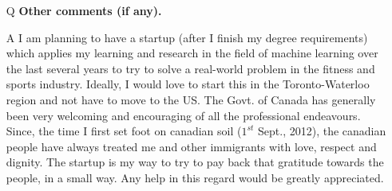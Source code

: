 \documentclass[12pt]{article}
\begin{document}
\begin{itemize}[leftmargin=*]
\item[Q] \textbf{Other comments (if any).}
\item[A] I am planning to have a startup (after I finish my degree requirements) which applies my learning and research in the field of machine learning over the last several years to try to solve a real-world problem in the fitness and sports industry. Ideally, I would love to start this in the Toronto-Waterloo region and not have to move to the US. The Govt. of Canada  has generally been very welcoming and encouraging of all the professional endeavours. Since, the time I first set foot on canadian soil ($1^{st}$ Sept., 2012), the canadian people have always treated me and other immigrants with love, respect and dignity. The startup is my way to try to pay back that gratitude towards the people, in a small way. Any help in this regard would be greatly appreciated.
\end{itemize}
\end{document}
